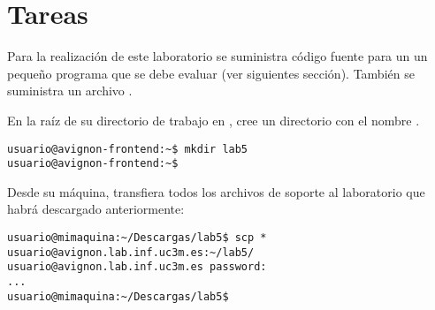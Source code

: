 \section{Tareas}

Para la realización de este laboratorio se suministra código fuente para un
un pequeño programa que se debe evaluar (ver siguientes sección).
También se suministra un archivo .

En la raíz de su directorio de trabajo en , cree un
directorio con el nombre .

\begin{lstlisting}[style=terminal,aboveskip=1em,belowskip=1em]
usuario@avignon-frontend:~$ mkdir lab5
usuario@avignon-frontend:~$
\end{lstlisting}

Desde su máquina, transfiera todos los archivos de soporte al laboratorio
que habrá descargado anteriormente:

\begin{lstlisting}[style=terminal,aboveskip=1em,belowskip=1em]
usuario@mimaquina:~/Descargas/lab5$ scp * usuario@avignon.lab.inf.uc3m.es:~/lab5/
usuario@avignon.lab.inf.uc3m.es password: 
...
usuario@mimaquina:~/Descargas/lab5$ 
\end{lstlisting}


